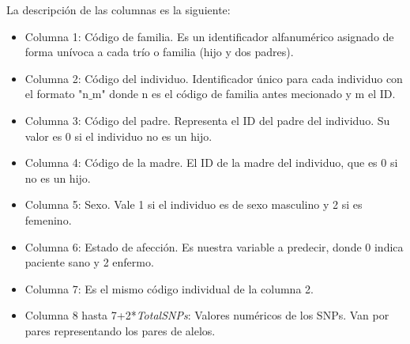 La descripción de las columnas es la siguiente:
\begin{itemize}
  \item Columna 1: Código de familia. Es un identificador alfanumérico asignado de forma unívoca a cada trío o familia (hijo y dos padres).
  \item Columna 2: Código del individuo. Identificador único para cada individuo con el formato "n$\_$m" donde n es el código de familia antes mecionado y m el ID.
  \item Columna 3: Código del padre. Representa el ID del padre del individuo. Su valor es 0 si el individuo no es un hijo.
  \item Columna 4: Código de la madre. El ID de la madre del individuo, que es 0 si no es un hijo.
  \item Columna 5: Sexo. Vale 1 si el individuo es de sexo masculino y 2 si es femenino.
  \item Columna 6: Estado de afección. Es nuestra variable a predecir, donde 0 indica paciente sano y 2 enfermo.
  \item Columna 7: Es el mismo código individual de la columna 2.
  \item Columna 8 hasta 7+2*\textit{TotalSNPs}: Valores numéricos de los SNPs. Van por pares representando los pares de alelos.
  \end{itemize}

